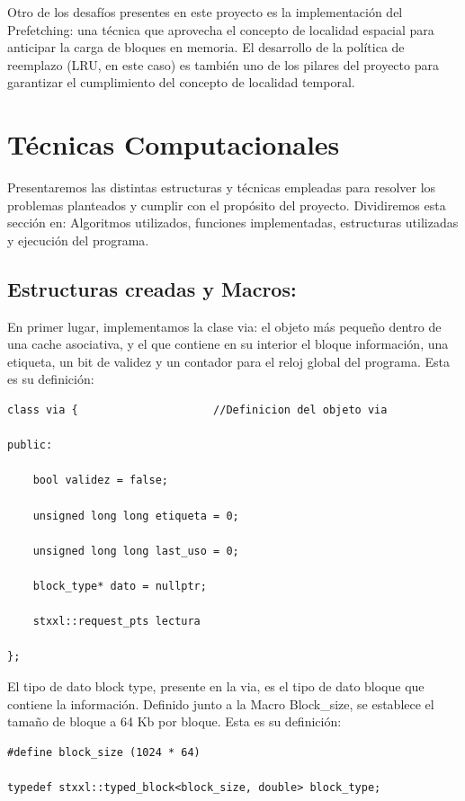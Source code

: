 \documentclass[11pt,letterpaper]{article}
\begin{document}
Otro de los desafíos presentes en este proyecto es la implementación del Prefetching: una técnica que aprovecha el concepto de localidad espacial para anticipar la carga de bloques en memoria. El desarrollo de la política de reemplazo (LRU, en este caso) es también uno de los pilares del proyecto para garantizar el cumplimiento del concepto de localidad temporal.

\section*{Técnicas Computacionales}

Presentaremos las distintas estructuras y técnicas empleadas para resolver los problemas planteados y cumplir con el propósito del proyecto. Dividiremos esta sección en: Algoritmos utilizados, funciones implementadas, estructuras utilizadas y ejecución del programa.

\subsection*{Estructuras creadas y Macros:}

En primer lugar, implementamos la clase via: el objeto más pequeño dentro de una cache asociativa, y el que contiene en su interior el bloque información, una etiqueta, un bit de validez y un contador para el reloj global del programa. Esta es su definición:

\begin{lstlisting}
class via {                     //Definicion del objeto via

public:

    bool validez = false;

    unsigned long long etiqueta = 0;

    unsigned long long last_uso = 0;

    block_type* dato = nullptr;

    stxxl::request_pts lectura

};
\end{lstlisting}

El tipo de dato block type, presente en la via, es el tipo de dato bloque que contiene la información. Definido junto a la Macro Block\_size, se establece el tamaño de bloque a 64 Kb por bloque. Esta es su definición:

\begin{lstlisting}
#define block_size (1024 * 64)

typedef stxxl::typed_block<block_size, double> block_type;
\end{lstlisting}
\end{document}
